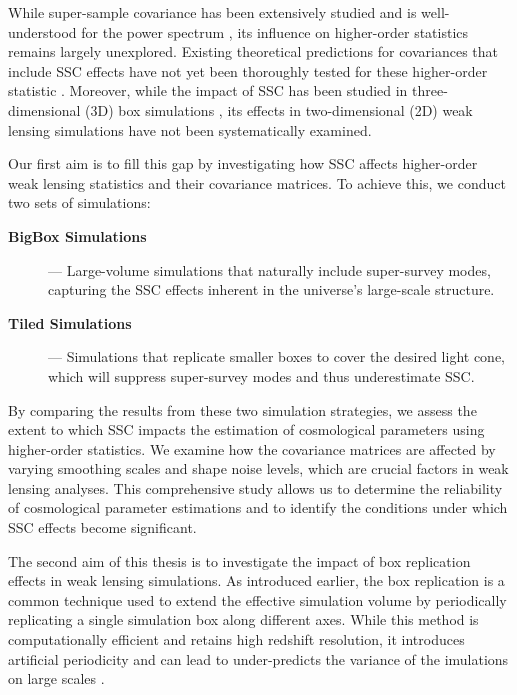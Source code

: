 While super-sample covariance has been extensively studied and is well-understood for the power spectrum \citep{PhysRevD.87.123504, 2017JCAP...11..051B, 2018JCAP...06..015B}, its influence on higher-order statistics remains largely unexplored. Existing theoretical predictions for covariances that include SSC effects \citep{2023A&A...672A.185L, 2023OJAp....6E...1U} have not yet been thoroughly tested for these higher-order statistic \citep{2023A&A...675A.120E}. Moreover, while the impact of SSC has been studied in three-dimensional (3D) box simulations \citep{PhysRevD.108.043521}, its effects in two-dimensional (2D) weak lensing simulations have not been systematically examined.

Our first aim is to fill this gap by investigating how SSC affects higher-order weak lensing statistics and their covariance matrices. To achieve this, we conduct two sets of simulations:
\begin{description}
    \item[\textbf{BigBox Simulations}] --- Large-volume simulations that naturally include super-survey modes, capturing the SSC effects inherent in the universe's large-scale structure.
    \item[\textbf{Tiled Simulations}] --- Simulations that replicate smaller boxes to cover the desired light cone, which will suppress super-survey modes and thus underestimate SSC.
\end{description}
By comparing the results from these two simulation strategies, we assess the extent to which SSC impacts the estimation of cosmological parameters using higher-order statistics. We examine how the covariance matrices are affected by varying smoothing scales and shape noise levels, which are crucial factors in weak lensing analyses. This comprehensive study allows us to determine the reliability of cosmological parameter estimations and to identify the conditions under which SSC effects become significant.

The second aim of this thesis is to investigate the impact of box replication effects in weak lensing simulations. As introduced earlier, the box replication is a common technique used to extend the effective simulation volume by periodically replicating a single simulation box along different axes. While this method is computationally efficient and retains high redshift resolution, it introduces artificial periodicity and can lead to under-predicts the variance of the imulations on large scales \citep{2021JCAP...01..028Z}.

